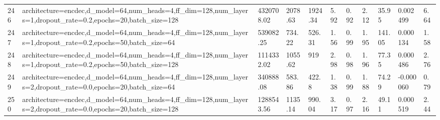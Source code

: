 \begin{longtable}{C{0.8cm} L{2cm} C{1.15cm} C{1.15cm} C{1.15cm} C{1.15cm} C{0.85cm} C{1.25cm} C{1.2cm} C{1.5cm} C{1.0cm}}
246 & architecture=encdec,\newline d\_model=64,\newline num\_heads=4,\newline ff\_dim=128,\newline num\_layers=1,\newline dropout\_rate=0.2,\newline epochs=20,\newline batch\_size=128 & 4320708.02 & 2078.63 & 1924.34 & 5.92 & 0.92 & 2.12 & 35.95 & 0.002499 & 6.64 \\
247 & architecture=encdec,\newline d\_model=64,\newline num\_heads=4,\newline ff\_dim=128,\newline num\_layers=1,\newline dropout\_rate=0.2,\newline epochs=50,\newline batch\_size=64 & 539082.25 & 734.22 & 526.31 & 1.56 & 0.99 & 1.95 & 141.05 & 0.000134 & 1.58 \\
248 & architecture=encdec,\newline d\_model=64,\newline num\_heads=4,\newline ff\_dim=128,\newline num\_layers=1,\newline dropout\_rate=0.2,\newline epochs=50,\newline batch\_size=128 & 1114332.02 & 1055.62 & 919 & 2.98 & 0.98 & 1.96 & 77.35 & 0.000486 & 2.76 \\
249 & architecture=encdec,\newline d\_model=64,\newline num\_heads=4,\newline ff\_dim=128,\newline num\_layers=2,\newline dropout\_rate=0.0,\newline epochs=20,\newline batch\_size=64 & 340888.08 & 583.86 & 422.8 & 1.38 & 0.99 & 1.88 & 74.29 & -0.000060 & 0.79 \\
250 & architecture=encdec,\newline d\_model=64,\newline num\_heads=4,\newline ff\_dim=128,\newline num\_layers=2,\newline dropout\_rate=0.0,\newline epochs=20,\newline batch\_size=128 & 1288543.56 & 1135.14 & 990.04 & 3.17 & 0.97 & 2.16 & 49.11 & 0.000519 & 2.44 \\

\end{longtable}
